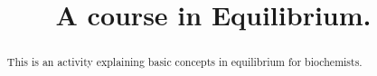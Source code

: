 \documentclass{xourse}
\title{A course in Equilibrium.}
\begin{document}
  
\begin{abstract} %
This is an activity explaining basic concepts in equilibrium for biochemists.  
\end{abstract}  
\maketitle  
 
 
\end{document}
